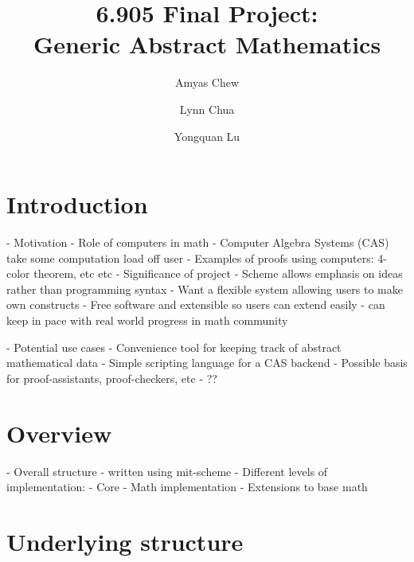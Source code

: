 \documentclass{article}
\begin{document}
    
    \title{6.905 Final Project:\\Generic Abstract Mathematics}
    \author{Amyas Chew \and Lynn Chua \and Yongquan Lu}
    \maketitle
    
    
    \section{Introduction}
        
        - Motivation
            - Role of computers in math
                - Computer Algebra Systems (CAS) take some computation load off user
                - Examples of proofs using computers: 4-color theorem, etc etc
            - Significance of project
                - Scheme allows emphasis on ideas rather than programming syntax
                - Want a flexible system allowing users to make own constructs
                - Free software and extensible so users can extend easily
                    - can keep in pace with real world progress in math community
        
        - Potential use cases
            - Convenience tool for keeping track of abstract mathematical data
            - Simple scripting language for a CAS backend
            - Possible basis for proof-assistants, proof-checkers, etc
            - ??
    
    
    \section{Overview}
        
        - Overall structure
            - written using mit-scheme
            - Different levels of implementation:
                - Core
                - Math implementation
                - Extensions to base math
    
    
    \section{Underlying structure}
        
\end{document}
